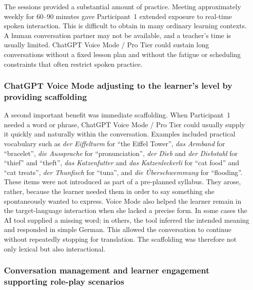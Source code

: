 \documentclass[11pt,a4paper]{article}
\begin{document}
The sessions provided a substantial amount of practice. Meeting approximately weekly for 60--90 minutes gave Participant~1 extended exposure to real-time spoken interaction. This is difficult to obtain in many ordinary learning contexts. A human conversation partner may not be available, and a teacher's time is usually limited. ChatGPT Voice Mode / Pro Tier could sustain long conversations without a fixed lesson plan and without the fatigue or scheduling constraints that often restrict spoken practice.

\subsubsection*{ChatGPT Voice Mode adjusting to the learner's level by providing scaffolding}

A second important benefit was immediate scaffolding. When Participant~1 needed a word or phrase, ChatGPT Voice Mode / Pro Tier could usually supply it quickly and naturally within the conversation. Examples included practical vocabulary such as \emph{der Eiffelturm} for ``the Eiffel Tower'', \emph{das Armband} for ``bracelet'', \emph{die Aussprache} for ``pronunciation'', \emph{der Dieb} and \emph{der Diebstahl} for ``thief'' and ``theft'', \emph{das Katzenfutter} and \emph{das Katzenleckerli} for ``cat food'' and ``cat treats'', \emph{der Thunfisch} for ``tuna'', and \emph{die \'{U}berschwemmung} for ``flooding''. These items were not introduced as part of a pre-planned syllabus. They arose, rather, because the learner needed them in order to say something she spontaneously wanted to express. Voice Mode also helped the learner remain in the target-language interaction when she lacked a precise form. In some cases the AI tool supplied a missing word; in others, the tool inferred the intended meaning and responded in simple German. This allowed the conversation to continue without repeatedly stopping for translation. The scaffolding was therefore not only lexical but also interactional.

\subsubsection*{Conversation management and learner engagement supporting role-play scenarios}
\end{document}
